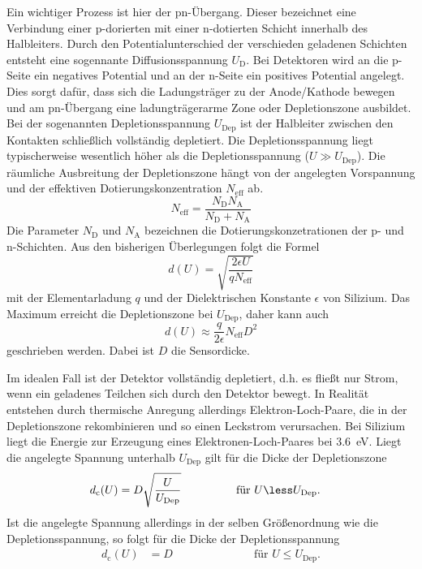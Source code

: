 Ein wichtiger Prozess ist hier der pn-Übergang. Dieser bezeichnet eine Verbindung
einer p-dorierten mit einer n-dotierten Schicht innerhalb des Halbleiters. Durch den
Potentialunterschied der verschieden geladenen Schichten entsteht eine sogennante
Diffusionsspannung $U_\text{D}$. Bei Detektoren wird an die p-Seite ein negatives
Potential und an der n-Seite ein positives Potential angelegt. Dies sorgt dafür,
dass sich die Ladungsträger zu der Anode/Kathode bewegen und am pn-Übergang eine
ladungträgerarme Zone oder Depletionszone ausbildet.
Bei der sogenannten Depletionsspannung $U_\text{Dep}$ ist der Halbleiter zwischen den
Kontakten schließlich vollständig depletiert.
Die Depletionsspannung liegt typischerweise wesentlich höher als die
Depletionsspannung ($U \gg U_\text{Dep}$). Die räumliche Ausbreitung der Depletionszone
hängt von der angelegten Vorspannung und der effektiven Dotierungskonzentration
$N_\text{eff}$ ab.
\begin{equation}
  N_\text{eff} = \frac{N_\text{D}N_\text{A}}{N_\text{D}+N_\text{A}}
\end{equation}
Die Parameter $N_\text{D}$ und $N_\text{A}$ bezeichnen die Dotierungskonzetrationen
der p- und n-Schichten.
Aus den bisherigen Überlegungen folgt die Formel
\begin{equation}
  d(U) = \sqrt{\frac{2\epsilon U}{q N_\text{eff}}}
\end{equation}
mit der Elementarladung $q$ und der Dielektrischen Konstante $\epsilon$ von
Silizium. Das Maximum erreicht die Depletionszone bei $U_\text{Dep}$, daher kann
auch
\begin{equation}
  d(U) \approx \frac{q}{2\epsilon} N_\text{eff}D^2
\end{equation}
geschrieben werden. Dabei ist $D$ die Sensordicke.

Im idealen Fall ist der Detektor vollständig depletiert, d.h. es fließt nur Strom,
wenn ein geladenes Teilchen sich durch den Detektor bewegt. In Realität entstehen
durch thermische Anregung allerdings Elektron-Loch-Paare, die in der Depletionszone
rekombinieren und so einen Leckstrom verursachen. Bei Silizium liegt die Energie
zur Erzeugung eines Elektronen-Loch-Paares bei \SI{3.6}{\electronvolt}.
Liegt die angelegte Spannung unterhalb $U_\text{Dep}$ gilt
für die Dicke der Depletionszone
\begin{align}
  d_\text{c}(U) &= D\sqrt{\frac{U}{U_\text{Dep}}} \hspace{1.7cm}\text{für } U \less U_\text{Dep}.
  \label{eqn:dicke-depletionszone}
\end{align}
Ist die angelegte Spannung allerdings in der selben Größenordnung wie die Depletionsspannung,
 so folgt für die Dicke der Depletionsspannung
 \begin{align*}
   d_\text{c}(U) &= D \hspace{3cm}\text{für } U \le U_\text{Dep}.
 \end{align*}

